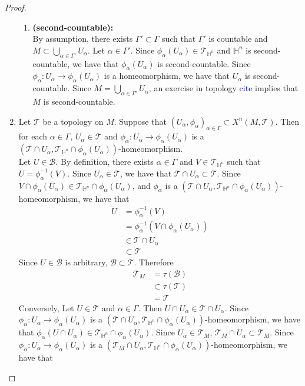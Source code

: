 \documentclass{book}
\theoremstyle{definition}
\newcommand{\al}{\alpha}
\newcommand{\Gam}{\Gamma}
\renewcommand{\H}{\mathbb{H}}
\newcommand{\MB}{\mathcal{B}}
\newcommand{\MT}{\mathcal{T}}
\DeclareMathOperator*{\0}{\mbf{0}}
\DeclareMathOperator*{\1}{\mbf{1}}
\newcommand{\tbf}[1]{\textbf{#1}}
\newcommand{\tcb}[1]{\textcolor{blue}{#1}}
\begin{document}
\begin{proof}
\begin{enumerate}
\begin{enumerate}
			\item \tbf{(second-countable):} \\
			By assumption, there exists $\Gam' \subset \Gam$ such that $\Gam'$ is countable and $M \subset \bigcup\limits_{\al \in \Gam'} U_{\al}$. Let $\al \in \Gam'$. Since $\phi_{\al}(U_{\al}) \in \MT_{\H^n}$ and $\H^n$ is second-countable, we have that $\phi_{\al}(U_{\al})$ is second-countable. Since $\phi_{\al}: U_{\al} \rightarrow \phi_{\al}(U_{\al})$ is a homeomorphism, we have that $U_{\al}$ is second-countable. Since $M = \bigcup\limits_{\al \in \Gam'} U_{\al}$, an exercise in topology \tcb{cite} implies that $M$ is second-countable.
		\end{enumerate} 
	\item Let $\MT$ be a topology on $M$. Suppose that $(U_{\al}, \phi_{\al})_{\al \in \Gam} \subset X^n(M, \MT)$. Then for each $\al \in \Gam$, $U_{\al} \in \MT$ and $\phi_{\al}: U_{\al} \rightarrow \phi_{\al}(U_{\al})$ is a $(\MT \cap U_{\al}, \MT_{\H^n} \cap \phi_{\al}(U_{\al}))$-homeomorphism. \\ 
	Let $U \in \MB$. By definition, there exists $\al \in \Gam$ and $V \in \MT_{\H^n}$ such that $U = \phi_{\al}^{-1}(V)$. Since $U_{\al} \in \MT$, we have that $\MT \cap U_{\al} \subset \MT$. Since $V \cap \phi_{\al}(U_{\al}) \in \MT_{\H^n} \cap \phi_{\al}(U_{\al})$, and $\phi_{\al}$ is a  $(\MT \cap U_{\al}, \MT_{\H^n} \cap \phi_{\al}(U_{\al}))$-homeomorphism, we have that
	\begin{align*}
		U
		& = \phi_{\al}^{-1}(V) \\
		& = \phi_{\al}^{-1}(V \cap \phi_{\al}(U_{\al})) \\
		& \in \MT \cap U_{\al} \\
		& \subset \MT 
	\end{align*}
	Since $U \in \MB$ is arbitrary, $\MB \subset \MT$. Therefore 
	\begin{align*}
		\MT_M 
		& = \tau(\MB) \\
		& \subset \tau(\MT) \\
		& = \MT
	\end{align*}
	Conversely, Let $U \in \MT$ and $\al \in \Gam$. Then $U \cap U_{\al} \in \MT \cap U_{\al}$. Since $\phi_{\al}:U_{\al} \rightarrow \phi_{\al}(U_{\al})$ is a $(\MT \cap U_{\al}, \MT_{\H^n} \cap \phi_{\al}(U_{\al}))$-homeomorphism, we have that $\phi_{\al}(U \cap U_{\al}) \in \MT_{\H^n} \cap \phi_{\al}(U_{\al})$. Since $U_{\al} \in \MT_M$, $\MT_M \cap U_{\al} \subset \MT_M$. Since $\phi_{\al}:U_{\al} \rightarrow \phi_{\al}(U_{\al})$ is a $(\MT_M \cap U_{\al}, \MT_{\H^n} \cap \phi_{\al}(U_{\al}))$-homeomorphism, we have that 

\end{enumerate}
\end{proof}
\end{document}
